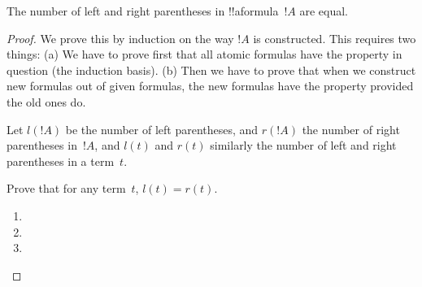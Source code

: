 \begin{lem}
The number of left and right parentheses in !!a{formula}~$!A$ are
equal.
\end{lem}

\begin{proof}
We prove this by induction on the way $!A$ is constructed. This
requires two things: (a) We have to prove first that all atomic
formulas have the property in question (the induction basis). (b) Then
we have to prove that when we construct new formulas out of given
formulas, the new formulas have the property provided the old ones do.

Let $l(!A)$ be the number of left parentheses, and $r(!A)$ the number
of right parentheses in~$!A$, and $l(t)$ and $r(t)$ similarly the
number of left and right parentheses in a term~$t$.

\begin{prob}
    Prove that for any term~$t$, $l(t) = r(t)$.
\end{prob}

\begin{enumerate}



\item {}

\item {}


\item {}






\end{enumerate}
\end{proof}


